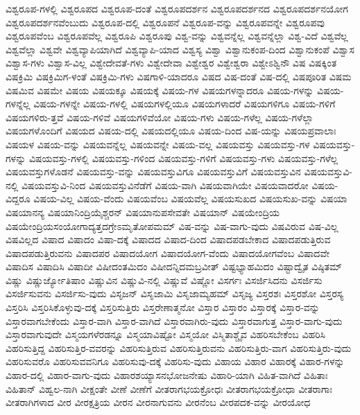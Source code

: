 {ವಿಶ್ವರೂಪ-ಗಳಲ್ಲಿ
ವಿಶ್ವರೂಪದ
ವಿಶ್ವರೂಪ-ದಂತೆ
ವಿಶ್ವರೂಪದರ್ಶನ
ವಿಶ್ವರೂಪದರ್ಶನದ
ವಿಶ್ವರೂಪದರ್ಶನಯೋಗ
ವಿಶ್ವರೂಪದರ್ಶನವೆಂಬುದು
ವಿಶ್ವರೂಪ-ದಲ್ಲಿ
ವಿಶ್ವರೂಪನೆ
ವಿಶ್ವರೂಪ-ವನ್ನು
ವಿಶ್ವರೂಪವನ್ನೇ
ವಿಶ್ವರೂಪವು
ವಿಶ್ವರೂಪವೆಂಬ
ವಿಶ್ವರೂಪವೆಲ್ಲ
ವಿಶ್ವರೂಪಿ
ವಿಶ್ವರೂಪು
ವಿಶ್ವ-ವನ್ನು
ವಿಶ್ವವನ್ನೆಲ್ಲ
ವಿಶ್ವವನ್ನೆಲ್ಲಾ
ವಿಶ್ವ-ವಿದೆ
ವಿಶ್ವವೆಲ್ಲ
ವಿಶ್ವವೆಲ್ಲಾ
ವಿಶ್ವವೇ
ವಿಶ್ವವ್ಯಾಪಿಯಾಗಿದೆ
ವಿಶ್ವವ್ಯಾಪಿ-ಯಾದ
ವಿಶ್ವಸ್ಯ
ವಿಶ್ವಾ
ವಿಶ್ವಾನುಕಂಪ-ದಿಂದ
ವಿಶ್ವಾನುಕಂಪೆ
ವಿಶ್ವಾಸ
ವಿಶ್ವಾಸ-ಗಳು
ವಿಶ್ವಾಸ-ವಿಲ್ಲ
ವಿಶ್ವೇದೇವತೆ-ಗಳು
ವಿಶ್ವೇದೇವಾ
ವಿಶ್ವೇಶ್ವರ
ವಿಶ್ವೇಶ್ವರಾ
ವಿಶ್ವೇಽಶ್ವಿನೌ
ವಿಷ
ವಿಷಕ್ಕಿಂತ
ವಿಷಕ್ರಿಮಿ
ವಿಷಕ್ರಿಮಿಗ-ಳಂತೆ
ವಿಷಕ್ರಿಮಿ-ಗಳು
ವಿಷಗಾಳಿ-ಯಾದರೂ
ವಿಷದ
ವಿಷ-ದಂತೆ
ವಿಷ-ದಲ್ಲಿ
ವಿಷಪೂರಿತ
ವಿಷಮ
ವಿಷಮಿವ
ವಿಷಮೇ
ವಿಷಯ
ವಿಷಯಕ್ಕೂ
ವಿಷಯಕ್ಕೆ
ವಿಷಯ-ಗಳ
ವಿಷಯಗಳನ್ನಾದರೂ
ವಿಷಯ-ಗಳನ್ನು
ವಿಷಯ-ಗಳನ್ನೆಲ್ಲ
ವಿಷಯ-ಗಳನ್ನೇ
ವಿಷಯ-ಗಳಲ್ಲಿ
ವಿಷಯಗಳಲ್ಲಿಯೂ
ವಿಷಯಗಳಾದರೆ
ವಿಷಯಗಳಿಗೂ
ವಿಷಯ-ಗಳಿಗೆ
ವಿಷಯಗಳಿರು-ತ್ತವೆ
ವಿಷಯ-ಗಳಿವೆ
ವಿಷಯಗಳಿವೆಯೋ
ವಿಷಯ-ಗಳು
ವಿಷಯ-ಗಳೆಲ್ಲ
ವಿಷಯ-ಗಳೆಲ್ಲಾ
ವಿಷಯಗಳೊಂದಿಗೆ
ವಿಷಯದ
ವಿಷಯ-ದಲ್ಲಿ
ವಿಷಯದಲ್ಲಿಯೂ
ವಿಷಯ-ದಿಂದ
ವಿಷ-ಯನ್ನು
ವಿಷಯಪ್ರವಾಲಾಃ
ವಿಷಯಳ
ವಿಷಯ-ವನ್ನು
ವಿಷಯವನ್ನೆಲ್ಲ
ವಿಷಯವನ್ನೇ
ವಿಷಯ-ವಲ್ಲ
ವಿಷಯವಸ್ತು
ವಿಷಯವಸ್ತು-ಗಳ
ವಿಷಯವಸ್ತು-ಗಳನ್ನು
ವಿಷಯವಸ್ತು-ಗಳಲ್ಲಿ
ವಿಷಯವಸ್ತು-ಗಳಿಂದ
ವಿಷಯವಸ್ತು-ಗಳಿಗೆ
ವಿಷಯವಸ್ತು-ಗಳು
ವಿಷಯವಸ್ತು-ಗಳೆಲ್ಲ
ವಿಷಯವಸ್ತುಗಳೊಡನೆ
ವಿಷಯವಸ್ತು-ವನ್ನು
ವಿಷಯವಸ್ತುವಿಗೂ
ವಿಷಯವಸ್ತುವಿಗೆ
ವಿಷಯವಸ್ತುವಿನ
ವಿಷಯವಸ್ತುವಿ-ನಲ್ಲಿ
ವಿಷಯವಸ್ತುವಿ-ನಿಂದ
ವಿಷಯವಸ್ತುವಿನೆಡೆಗೆ
ವಿಷಯ-ವಾಗಿ
ವಿಷಯವಾಗಿಯೇ
ವಿಷಯವಾದರೋ
ವಿಷಯ-ವಿದ್ದರೂ
ವಿಷಯ-ವಿಲ್ಲ
ವಿಷಯ-ವೆಂದು
ವಿಷಯವೆಂಬ
ವಿಷಯವೆಲ್ಲ
ವಿಷಯಸುಖದ
ವಿಷಯಸುಖ-ವನ್ನು
ವಿಷಯಾ
ವಿಷಯಾನನ್ಯ
ವಿಷಯಾನಿಂದ್ರಿಯೈಶ್ಚರನ್
ವಿಷಯಾನುಪಸೇವತೇ
ವಿಷಯಾನ್
ವಿಷಯೇಂದ್ರಿಯ
ವಿಷಯೇಂದ್ರಿಯಸಂಯೋಗಾದ್ಯತ್ತದಗ್ರೇಽಮೃತೋಪಮಮ್
ವಿಷ-ವನ್ನು
ವಿಷ-ವಾಗು-ವುದು
ವಿಷವಿರುವ
ವಿಷ-ವಿಲ್ಲ
ವಿಷವಿಲ್ಲದ
ವಿಷಾದ
ವಿಷಾದಂ
ವಿಷಾ-ದಕ್ಕೆ
ವಿಷಾದದ
ವಿಷಾದ-ದಿಂದ
ವಿಷಾದಪಡಬೇಕಾದ
ವಿಷಾದಪಡುತ್ತಿರುವ
ವಿಷಾದಪಡುತ್ತಿರುವನು
ವಿಷಾದಪರ
ವಿಷಾದಯೋಗ
ವಿಷಾದಯೋಗ-ವೆಂದು
ವಿಷಾದಯೋಗವೆಂಬ
ವಿಷಾದವೇ
ವಿಷಾದಿಸ
ವಿಷಾದಿಸಿ
ವಿಷಾದೀ
ವಿಷೀದಂತಮಿದಂ
ವಿಷೀದನ್ನಿದಮಬ್ರವೀತ್
ವಿಷ್ಟಭ್ಯಾಹಮಿದಂ
ವಿಷ್ಟಾದ್ವೈತ
ವಿಷ್ಠಿತಮ್
ವಿಷ್ಣು
ವಿಷ್ಣುರ್ಜ್ಯೋತಿಷಾಂ
ವಿಷ್ಣುವಿನ
ವಿಷ್ಣುವಿ-ನಲ್ಲಿ
ವಿಷ್ಣುವೆ
ವಿಷ್ಣೋ
ವಿಸರ್ಗಃ
ವಿಸರ್ಜಿಸಿದನು
ವಿಸರ್ಜಿಸು
ವಿಸರ್ಜಿಸುವನು
ವಿಸರ್ಜಿಸು-ವುದು
ವಿಸೃಜನ್
ವಿಸೃಜಾಮಿ
ವಿಸೃಜಾಮ್ಯಹಮ್
ವಿಸೃಜ್ಯ
ವಿಸ್ತರಶಃ
ವಿಸ್ತರಶೋ
ವಿಸ್ತರಸ್ಯ
ವಿಸ್ತರಿಸಿ
ವಿಸ್ತರಿಸಿಕೊಳ್ಳುವು-ದಕ್ಕೆ
ವಿಸ್ತರಿಸುತ್ತಿರು
ವಿಸ್ತರೇಣಾತ್ಮನೋ
ವಿಸ್ತಾರ
ವಿಸ್ತಾರಂ
ವಿಸ್ತಾರಕ್ಕೆ
ವಿಸ್ತಾರ-ವನ್ನು
ವಿಸ್ತಾರವಾಗಬೇಕೆಂದು
ವಿಸ್ತಾರ-ವಾಗಿ
ವಿಸ್ತಾರ-ವಾಗಿದೆ
ವಿಸ್ತಾರವಾಗಿರು-ವುದು
ವಿಸ್ತಾರವಾಗುತ್ತ
ವಿಸ್ತಾರ-ವಾಗು-ವುದು
ವಿಸ್ತಾರವಾಗುವುದೇ
ವಿಸ್ಮಯಗಳೆರಡನ್ನೂ
ವಿಸ್ಮಯಾವಿಷ್ಟೋ
ವಿಸ್ಮಯೋ
ವಿಸ್ಮಿತಾಶ್ಚೈವ
ವಿಹರಿಸಬೇಕೆಂಬ
ವಿಹರಿಸಿ
ವಿಹರಿಸುತ್ತಿದ್ದ
ವಿಹರಿಸುತ್ತಿರ-ವವರನ್ನು
ವಿಹರಿಸುತ್ತಿರುವ
ವಿಹರಿಸುತ್ತಿರುವನು
ವಿಹರಿಸುತ್ತಿರು-ವಾಗ
ವಿಹರಿಸುತ್ತಿರು-ವುದು
ವಿಹರಿಸುವರೊ
ವಿಹರಿಸುವವನಿಗೂ
ವಿಹರಿಸುವು-ದಕ್ಕೆ
ವಿಹರಿಸು-ವುದು
ವಿಹಾಯ
ವಿಹಾರ
ವಿಹಾರಕ್ಕೆ
ವಿಹಾರ-ಗಳನ್ನು
ವಿಹಾರ-ದಲ್ಲಿ
ವಿಹಾರ-ವಾಗು-ವುದು
ವಿಹಾರಶಯ್ಯಾಸನಭೋಜನೇಷು
ವಿಹಾರಿ-ಯಾಗಿ
ವಿಹಿತ-ವಾಗಿದೆ
ವಿಹಿತಾಃ
ವಿಹಿತಾನ್
ವಿಹ್ವಲ-ನಾಗಿ
ವೀಕ್ಷಂತೇ
ವೀಣೆ
ವೀಣೆಗೆ
ವೀತರಾಗಭಯಕ್ರೋಧಃ
ವೀತರಾಗಭಯಕ್ರೋಧಾ
ವೀತರಾಗಾಃ
ವೀತರಾಗಿಗಳಾದ
ವೀರ
ವೀರಕ್ಷತ್ರಿಯ
ವೀರನ
ವೀರನಾಗುವನು
ವೀರನೆಂಬ
ವೀರಪದಕ-ವನ್ನು
ವೀರಯೋಧ
}
